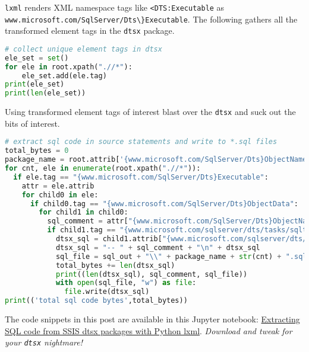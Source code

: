 \texttt{lxml} renders XML namespace tags like
\verb|<DTS:Executable| as
\verb|www.microsoft.com/SqlServer/Dts\}Executable|. The following
gathers all the transformed element tags in the \texttt{dtsx} package.

\begin{tcolorbox}[breakable, size=fbox, boxrule=1pt, pad at break*=1mm,colback=cellbackground, colframe=cellborder]
\begin{lstlisting}[language=python, frame=single, framerule=0pt, label=lst:scr5673X4]
# collect unique element tags in dtsx
ele_set = set()
for ele in root.xpath(".//*"):
    ele_set.add(ele.tag)    
print(ele_set)
print(len(ele_set))
\end{lstlisting}
\end{tcolorbox}

Using transformed element tags of interest blast over the \texttt{dtsx}
and suck out the bits of interest.

\begin{tcolorbox}[breakable, size=fbox, boxrule=1pt, pad at break*=1mm,colback=cellbackground, colframe=cellborder]
\begin{lstlisting}[language=python, frame=single, framerule=0pt, label=lst:scr5673X5, basicstyle=\ttfamily\scriptsize]
# extract sql code in source statements and write to *.sql files 
total_bytes = 0
package_name = root.attrib['{www.microsoft.com/SqlServer/Dts}ObjectName'].replace(" ","")
for cnt, ele in enumerate(root.xpath(".//*")):
  if ele.tag == "{www.microsoft.com/SqlServer/Dts}Executable":
    attr = ele.attrib
    for child0 in ele:
      if child0.tag == "{www.microsoft.com/SqlServer/Dts}ObjectData":
        for child1 in child0:
          sql_comment = attr["{www.microsoft.com/SqlServer/Dts}ObjectName"].strip()
          if child1.tag == "{www.microsoft.com/sqlserver/dts/tasks/sqltask}SqlTaskData":
            dtsx_sql = child1.attrib["{www.microsoft.com/sqlserver/dts/tasks/sqltask}SqlStatementSource"]
            dtsx_sql = "-- " + sql_comment + "\n" + dtsx_sql
            sql_file = sql_out + "\\" + package_name + str(cnt) + ".sql"
            total_bytes += len(dtsx_sql)
            print((len(dtsx_sql), sql_comment, sql_file))
            with open(sql_file, "w") as file:
              file.write(dtsx_sql)
print(('total sql code bytes',total_bytes))
\end{lstlisting}
\end{tcolorbox}


The code snippets in this post are available in this Jupyter notebook:
\href{https://github.com/bakerjd99/jacks/blob/master/notebooks/Extracting\%20SQL\%20code\%20from\%20SSIS\%20dtsx\%20packages\%20with\%20Python\%20lxml.ipynb}{Extracting
SQL code from SSIS dtsx packages with Python lxml}. \emph{Download and tweak
for your \texttt{dtsx} nightmare!}


